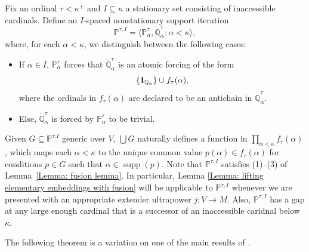 \documentclass[11pt]{amsart}
\theoremstyle{definition}
\newcounter{condition}
\theoremstyle{remark}
\newcommand\<{{<}}
\DeclareMathOperator{\supp}{supp}
\newcommand{\one}{\mathop{1\hskip-3pt {\rm l}}}
\def\s{\subseteq}
\newcommand{\po}{\mathbb{P}}
\newcommand{\qo}{\mathbb{Q}}
\newcommand{\la}{\langle}
\newcommand{\ra}{\rangle}
\begin{document}
\smallskip


Fix an ordinal $\tau<\kappa^+$ and $I\s \kappa$ a stationary set consisting of inaccessible cardinals. Define an $I$-spaced nonstationary support iteration $$\po^{\tau, I} = \la \po^\tau_\alpha, \dot{\qo}^\tau_\alpha \colon \alpha<\kappa \ra,$$ where, for each $\alpha<\kappa$, we distinguish between the following cases:
\begin{itemize}
    \item If $\alpha\in I$, $\po^\tau_\alpha$ forces that $\dot{\qo}^\tau_\alpha$ is an atomic forcing of the form $$\textstyle \{ \one_{\qo_\alpha} \}\cup f_\tau(\alpha),$$ where the ordinals in $f_{\tau}(\alpha)$ are declared to be an antichain in  $\dot{\mathbb{Q}}^\tau_\alpha$.
    \item Else, $\dot{\qo}^\tau_\alpha$ is forced by $\mathbb{P}_\alpha^\tau$ to be trivial. 
\end{itemize}

Given $G\subseteq \po^{\tau. I} $ generic over $V$, $\bigcup G$ naturally defines a function in  $\prod_{\alpha<\kappa} f_\tau(\alpha)$, which maps each $\alpha<\kappa$ to the unique common value $p(\alpha)\in f_{\tau}(\alpha)$ for conditions $p\in G$ such that $\alpha\in \supp(p)$.
Note that $\mathbb{P}^{\tau,I}$ satisfies (1)--(3) of Lemma~\ref{Lemma: fusion lemma}. In particular, Lemma \ref{Lemma: lifting elementary embeddings with fusion} will be applicable to $\po^{\tau,I}$  whenever we are presented with an appropriate extender ultrapower $j\colon V\rightarrow M$. Also,   $\po^{\tau,I}$ has a gap at any large enough cardinal that is a  successor of an inaccessible caridnal below $\kappa$.

\smallskip


The following theorem is a variation on one of the main results of \cite{Kaplan}. 
\end{document}
